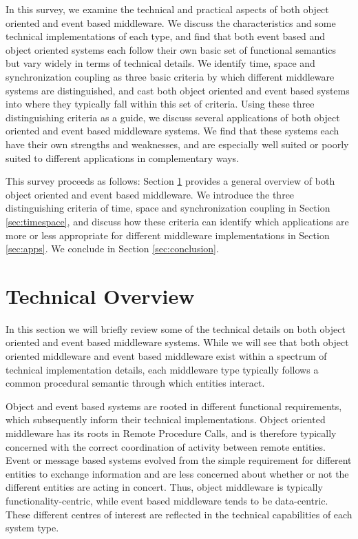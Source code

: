 \documentclass{acm_proc_article-sp}
\begin{document}
In this survey, we examine the technical and practical aspects of both object oriented and event based middleware. We discuss the characteristics and some technical implementations of each type, and find that both event based and object oriented systems each follow their own basic set of functional semantics but vary widely in terms of technical details. We identify time, space and synchronization coupling as three basic criteria by which different middleware systems are distinguished, and cast both object oriented and event based systems into where they typically fall within this set of criteria. Using these three distinguishing criteria as a guide, we discuss several applications of both object oriented and event based middleware systems. We find that these systems each have their own strengths and weaknesses, and are especially well suited or poorly suited to different applications in complementary ways.

This survey proceeds as follows: Section \ref{sec:technical} provides a general overview of both object oriented and event based middleware. We introduce the three distinguishing criteria of time, space and synchronization coupling in Section \ref{sec:timespace}, and discuss how these criteria can identify which applications are more or less appropriate for different middleware implementations in Section \ref{sec:apps}. We conclude in Section \ref{sec:conclusion}.




\section{Technical Overview}
\label{sec:technical}


In this section we will briefly review some of the technical details on both object oriented and event based middleware systems. While we will see that both object oriented middleware and event based middleware exist within a spectrum of technical implementation details, each middleware type typically follows a common procedural semantic through which entities interact. 

Object and event based systems are rooted in different functional requirements, which subsequently inform their technical implementations. Object oriented middleware has its roots in Remote Procedure Calls, and is therefore typically concerned with the correct coordination of activity between remote entities. Event or message based systems evolved from the simple requirement for different entities to exchange information and are less concerned about whether or not the different entities are acting in concert. Thus, object middleware is typically functionality-centric, while event based middleware tends to be data-centric. These different centres of interest are reflected in the technical capabilities of each system type. 
\end{document}
